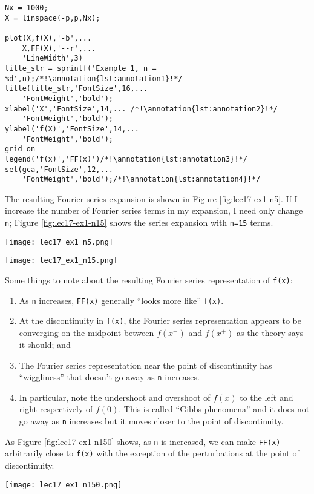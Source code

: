 \begin{lstlisting}[name=lec17-ex1]
Nx = 1000;
X = linspace(-p,p,Nx);

plot(X,f(X),'-b',...
    X,FF(X),'--r',...
    'LineWidth',3)
title_str = sprintf('Example 1, n = %d',n);/*!\annotation{lst:annotation1}!*/
title(title_str,'FontSize',16,...
    'FontWeight','bold');
xlabel('X','FontSize',14,... /*!\annotation{lst:annotation2}!*/
    'FontWeight','bold');
ylabel('f(X)','FontSize',14,...
    'FontWeight','bold');
grid on
legend('f(x)','FF(x)')/*!\annotation{lst:annotation3}!*/
set(gca,'FontSize',12,...
    'FontWeight','bold');/*!\annotation{lst:annotation4}!*/
\end{lstlisting} \setcounter{lstannotation}{0}
The resulting Fourier series expansion is shown in Figure \ref{fig:lec17-ex1-n5}. If I increase the number of Fourier series terms in my expansion, I need only change \lstinline{n}; Figure \ref{fig:lec17-ex1-n15} shows the series expansion with \lstinline{n=15} terms.
\begin{marginfigure}
\texttt{[image: lec17\_ex1\_n5.png]}
\caption{Fourier series expansion with \lstinline{n=5}.}
\label{fig:lec17-ex1-n5}
\end{marginfigure}

\begin{marginfigure}
\texttt{[image: lec17\_ex1\_n15.png]}
\caption{Fourier series expansion with \lstinline{n=15}.}
\label{fig:lec17-ex1-n15}
\end{marginfigure} 
Some things to note about the resulting Fourier series representation of \lstinline{f(x)}:
\begin{enumerate}
\item As \lstinline{n} increases, \lstinline{FF(x)} generally ``looks more like'' \lstinline{f(x)}.  
\item At the discontinuity in \lstinline{f(x)}, the Fourier series representation appears to be converging on the midpoint between $f(x^-)$ and $f(x^+)$ as the theory says it should; and
\item The Fourier series representation near the point of discontinuity has ``wiggliness'' that doesn't go away as \lstinline{n} increases.
\item In particular, note the undershoot and overshoot of $f(x)$ to the left and right respectively of $f(0)$.  This is called ``Gibbs phenomena'' and it does not go away as \lstinline{n} increases but it moves closer to the point of discontinuity.  
\end{enumerate}
As Figure \ref{fig:lec17-ex1-n150} shows, as \lstinline{n} is increased, we can make \lstinline{FF(x)} arbitrarily close to \lstinline{f(x)} with the exception of the perturbations at the point of discontinuity.
\begin{marginfigure}
\texttt{[image: lec17\_ex1\_n150.png]}
\caption{Fourier series expansion with \lstinline{n=150}.}
\label{fig:lec17-ex1-n150}
\end{marginfigure}

